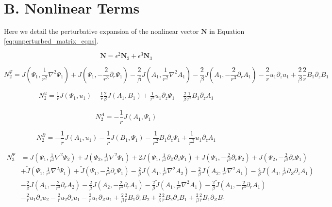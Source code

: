 \documentclass[onecolumn]{emulateapj}
\newcommand{\beq}{\begin{equation}}
\newcommand{\eeq}{\end{equation}}
\begin{document}
\section{B. Nonlinear Terms}\label{app:nonlinear_terms}

Here we detail the perturbative expansion of the nonlinear vector $\mathbf{N}$ in Equation \ref{eq:unperturbed_matrix_eqns}. 

\beq
\mathbf{N} = \epsilon^2 \mathbf{N}_2 + \epsilon^3 \mathbf{N}_3
\eeq

\beq
N_2^{\Psi}  = J(\Psi_1, \frac{1}{r^2} \nabla^2 \Psi_1) + J(\Psi_1, -\frac{2}{r^3}\partial_r\Psi_1)
- \frac{2}{\beta} J (A_1, \frac{1}{r^2} \nabla^2 A_1) - \frac{2}{\beta} J(A_1, -\frac{2}{r^3} \partial_r A_1) - \frac{2}{r} u_1 \partial_z u_1 + \frac{2}{\beta} \frac{2}{r} B_1 \partial_z B_1
\eeq

\beq
\begin{split}
N_2^{u} = \frac{1}{r} J\left(\Psi_1, u_1\right) - \frac{1}{r} \frac{2}{\beta} J\left(A_1, B_1\right) + \frac{1}{r^2} u_1 \partial_z \Psi_1 - \frac{2}{\beta}\frac{1}{r^2} B_1 \partial_z A_1
\end{split}
\eeq

\beq
N_2^A = -\frac{1}{r} J\left(A_1, \Psi_1\right)
\eeq

\beq
N_2^B = -\frac{1}{r} J\left(A_1, u_1\right) - \frac{1}{r} J\left(B_1, \Psi_1\right) - \frac{1}{r^2} B_1 \partial_z \Psi_1 + \frac{1}{r^2} u_1 \partial_z A_1
\eeq

\beq
\begin{split}
N_3^{\Psi} & = J(\Psi_1, \frac{1}{r^2} \nabla^2 \Psi_2) + J(\Psi_2, \frac{1}{r^2} \nabla^2\Psi_1) + 2 J (\Psi_1, \frac{1}{r^2}\partial_Z\partial_z \Psi_1) + J(\Psi_1, -\frac{2}{r^3}\partial_r \Psi_2) + J(\Psi_2, -\frac{2}{r^3}\partial_r \Psi_1) \\
& + \widetilde{J}(\Psi_1, \frac{1}{r^2} \nabla^2 \Psi_1) + \widetilde{J} (\Psi_1, -\frac{2}{r^3}\partial_r \Psi_1) - \frac{2}{\beta} J(A_1, \frac{1}{r^2}\nabla^2 A_2) - \frac{2}{\beta} J(A_2, \frac{1}{r^2}\nabla^2 A_1) - \frac{4}{\beta} J(A_1, \frac{1}{r^2}\partial_Z\partial_z A_1) \\ & - \frac{2}{\beta} J(A_1, -\frac{2}{r^3} \partial_r A_2 ) 
 - \frac{2}{\beta} J(A_2, -\frac{2}{r^3} \partial_r A_1) - \frac{2}{\beta} \widetilde{J} (A_1, \frac{1}{r^2} \nabla^2 A_1) - \frac{2}{\beta} \widetilde{J} (A_1, -\frac{2}{r^3} \partial_r A_1) \\
& - \frac{2}{r} u_1 \partial_z u_2 - \frac{2}{r} u_2 \partial_z u_1 - \frac{2}{r} u_1 \partial_Z u_1 + \frac{2}{\beta}\frac{2}{r} B_1\partial_z B_2 + \frac{2}{\beta}\frac{2}{r} B_2 \partial_z B_1 + \frac{2}{\beta} \frac{2}{r} B_1 \partial_Z B_1
\end{split}
\eeq
\end{document}
